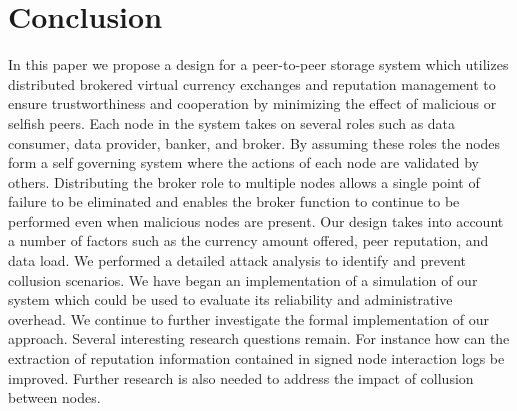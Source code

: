 \documentclass[%
				10pt,
        final,
        notitlepage,
        narroweqnarray,
        inline,
        twoside,
        ]{ieee}
\begin{document}
\section{Conclusion}
In this paper we propose a design for a peer-to-peer storage system which utilizes distributed brokered virtual currency exchanges and reputation management to ensure trustworthiness and cooperation by minimizing the effect of malicious or selfish peers.  Each node in the system takes on several roles such as data consumer, data provider, banker, and broker.  By assuming these roles the nodes form a self governing system where the actions of each node are validated by others.  Distributing the broker role to multiple nodes allows a single point of failure to be eliminated and enables the broker function to continue to be performed even when malicious nodes are present.   Our design takes into account a number of factors such as the currency amount offered, peer reputation, and data load.  We performed a detailed attack analysis to identify and prevent collusion scenarios.  We have began an implementation of a simulation of our system which could be used to evaluate its reliability and administrative overhead.  We continue to further investigate the formal implementation of our approach.  Several interesting research questions remain.  For instance how can the extraction of reputation information contained in signed node interaction logs be improved. Further research is also needed to address the impact of collusion between nodes.

\newpage








\end{document}
